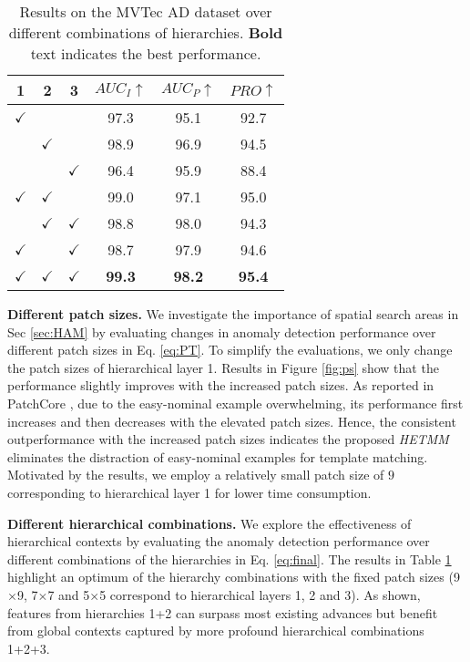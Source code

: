 \documentclass[default,iicol]{sn-jnl}\usepackage[algo2e,ruled,linesnumbered]{algorithm2e}
\theoremstyle{thmstyleone}\newtheorem{theorem}{Theorem}\newtheorem{proposition}[theorem]{Proposition}
\theoremstyle{thmstyletwo}\newtheorem{example}{Example}\newtheorem{remark}{Remark}
\theoremstyle{thmstylethree}\newtheorem{definition}{Definition}
\begin{document}
\begin{table}[!t]
    \caption{
        Results on the MVTec AD dataset over different combinations of hierarchies. \textbf{Bold} text indicates the best performance.
    }
    \centering
    \label{table:hierarchies}
    \begin{tabular}{ccc|ccc}
    \hline
    1            & 2            & 3            & $AUC_{I}\uparrow$ & $AUC_{P}\uparrow$ & $PRO\uparrow$ \\\hline
    $\checkmark$ &              &              & 97.3              & 95.1              & 92.7     \\
                 & $\checkmark$ &              & 98.9              & 96.9              & 94.5    \\
                 &              & $\checkmark$ & 96.4              & 95.9              & 88.4    \\
    $\checkmark$ & $\checkmark$ &              & 99.0              & 97.1              & 95.0    \\
                 & $\checkmark$ & $\checkmark$ & 98.8              & 98.0              & 94.3   \\
    $\checkmark$ &              & $\checkmark$ & 98.7              & 97.9              & 94.6   \\
    $\checkmark$ & $\checkmark$ & $\checkmark$ & \textbf{99.3}     & \textbf{98.2}     & \textbf{95.4}   \\\hline
    \end{tabular}
\end{table}

\noindent\textbf{Different patch sizes. }
We investigate the importance of spatial search areas in Sec \ref{sec:HAM} by evaluating changes in anomaly detection performance over different patch sizes in Eq. \ref{eq:PT}.
To simplify the evaluations, we only change the patch sizes of hierarchical layer 1.
Results in Figure \ref{fig:ps} show that the performance slightly improves with the increased patch sizes.
As reported in PatchCore \cite{patchcore}, due to the easy-nominal example overwhelming, its performance first increases and then decreases with the elevated patch sizes.
Hence, the consistent outperformance with the increased patch sizes indicates the proposed \textit{HETMM} eliminates the distraction of easy-nominal examples for template matching.
Motivated by the results, we employ a relatively small patch size of $9$ corresponding to hierarchical layer 1 for lower time consumption.

\noindent\textbf{Different hierarchical combinations. }
We explore the effectiveness of hierarchical contexts by evaluating the anomaly detection performance over different combinations of the hierarchies in Eq. \ref{eq:final}.
The results in Table \ref{table:hierarchies} highlight an optimum of the hierarchy combinations with the fixed patch sizes (9$\times$9, 7$\times$7 and 5$\times$5 correspond to hierarchical layers 1, 2 and 3).
As shown, features from hierarchies 1+2 can surpass most existing advances but benefit from global contexts captured by more profound hierarchical combinations 1+2+3.
\end{document}
